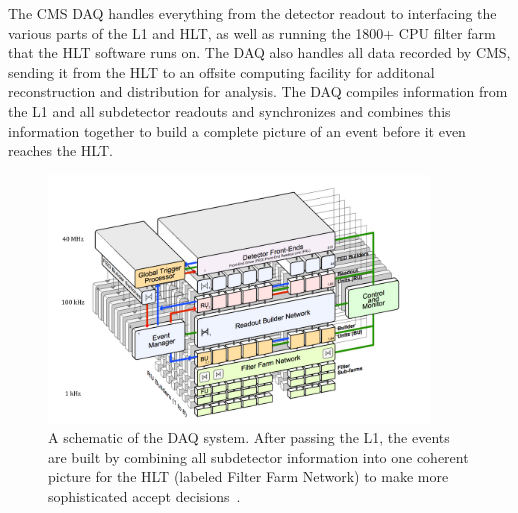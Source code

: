 The CMS DAQ handles everything from the detector readout to interfacing the various parts of the L1 and HLT, as well as running the 1800+ CPU filter farm that the HLT software runs on. The DAQ also handles all data recorded by CMS,
sending it from the HLT
to an offsite computing facility for additonal reconstruction and distribution for analysis. The DAQ compiles information from the L1 and all subdetector readouts and synchronizes and combines this information together to build a complete picture of an
event before it even reaches the HLT.    

\begin{figure}[hbtp]
 \begin{center}
   \includegraphics[width=0.9\textwidth]{ch3_figs/cms_daq.pdf}
   \caption[The CMS DAQ system]{A schematic of the DAQ system. After passing the L1, the events are built by combining all subdetector information into one coherent picture for the HLT (labeled Filter Farm Network) to make more sophisticated accept
     decisions~\cite{tridas}.}
   \label{fig:cms_daq}
 \end{center}
\end{figure}

%
% 
% 
